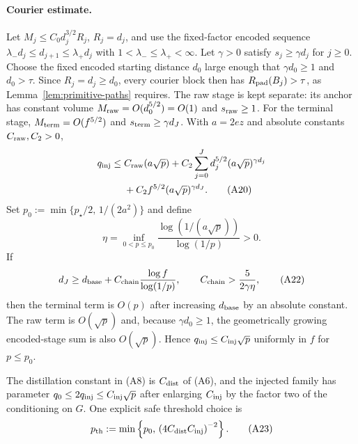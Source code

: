 \documentclass[aps,prx,reprint,superscriptaddress,nofootinbib,floatfix,longbibliography]{revtex4-2}
\theoremstyle{definition}
\begin{document}
\paragraph{Courier estimate.}
Let $M_j\leq C_0d_j^{3/2}R_j$, $R_j=d_j$, and use the fixed-factor encoded
sequence $\lambda_-d_j\le d_{j+1}\le\lambda_+d_j$ with
$1<\lambda_-\le\lambda_+<\infty$.  Let $\gamma>0$ satisfy
$s_j\geq\gamma d_j$ for $j\geq0$.  Choose the fixed encoded starting
distance $d_0$ large enough that $\gamma d_0\geq1$ and $d_0>\tau$.  Since
$R_j=d_j\geq d_0$, every courier block then has $R_{\rm pad}(B_j)>\tau$, as
Lemma~\ref{lem:primitive-paths} requires.  The raw stage is kept
separate: its anchor has constant volume $M_{\rm raw}=O(d_0^{5/2})=O(1)$ and
$s_{\rm raw}\geq1$.  For the terminal stage,
$M_{\rm term}=O(f^{5/2})$ and $s_{\rm term}\geq\gamma d_J$.
With $a=2ez$ and absolute constants $C_{\rm raw},C_2>0$,
\begin{align}
 q_{\rm inj}\leq{}&C_{\rm raw}(a\sqrt p)
       +C_2\sum_{j=0}^Jd_j^{5/2}(a\sqrt p)^{\gamma d_j}\nonumber\\
       &+C_2f^{5/2}(a\sqrt p)^{\gamma d_J}.                           \tag{A20}
\end{align}
Set $p_0:=\min\{p_\star/2,\,1/(2a^2)\}$ and define
\begin{equation}
 \eta=\inf_{0<p\leq p_0}
 \frac{\log(1/(a\sqrt p))}{\log(1/p)}>0.                            \tag{A21}
\end{equation}
If
\begin{equation}
 d_J\geq d_{\rm base}
       +C_{\rm chain}\frac{\log f}{\log(1/p)},\qquad
 C_{\rm chain}>\frac{5}{2\gamma\eta},                              \tag{A22}
\end{equation}
then the terminal term is $O(p)$ after increasing $d_{\rm base}$ by an
absolute constant.  The raw term is $O(\sqrt p)$ and, because $\gamma d_0\geq1$, the geometrically
growing encoded-stage sum is also $O(\sqrt p)$.  Hence $q_{\rm inj}\leq C_{\rm inj}\sqrt p$ uniformly in $f$ for $p\leq p_0$.


The distillation constant in (A8) is $C_{\rm dist}$ of (A6), and the
injected family has parameter $q_0\le2q_{\rm inj}\le C_{\rm inj}\sqrt p$ after
enlarging $C_{\rm inj}$ by the factor two of the conditioning on $G$.  One
explicit safe threshold choice is
\begin{equation}
 p_{\mathrm{th}}:=\min\left\{p_0,\,
       \left(4C_{\rm dist}C_{\rm inj}\right)^{-2}\right\}.
                                                                    \tag{A23}
\end{equation}
\end{document}
